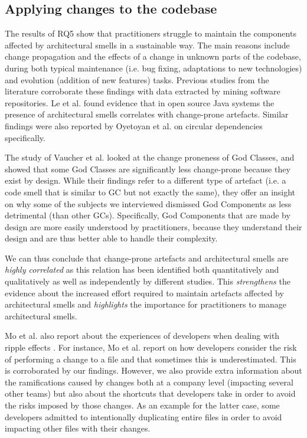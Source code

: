 \subsection{Applying changes to the codebase}
The results of RQ5 show that practitioners struggle to maintain the components affected by architectural smells in a sustainable way. The main reasons include change propagation and the effects of a change in unknown parts of the codebase, during both typical maintenance (i.e. bug fixing, adaptations to new technologies) and evolution (addition of new features) tasks.
Previous studies from the literature corroborate these findings with data extracted by mining software repositories. Le et al. \cite{Le2018} found evidence that in open source Java systems the presence of architectural smells correlates with change-prone artefacts. Similar findings were also reported by Oyetoyan et al. \cite{Oyetoyan2015} on circular dependencies specifically.

The study of Vaucher et al. \cite{Vaucher2009} looked at the change proneness of God Classes, and showed that some God Classes are significantly less change-prone because they exist by design. 
While their findings refer to a different type of artefact (i.e. a code smell that is similar to GC but not exactly the same), they offer an insight on why some of the subjects we interviewed dismissed God Components as less detrimental (than other GCs). Specifically, God Components that are made by design are more easily understood by practitioners, because they understand their design and are thus better able to handle their complexity. 

We can thus conclude that change-prone artefacts and architectural smells are \emph{highly correlated} as this relation has been identified both quantitatively and qualitatively as well as independently by different studies.
This \emph{strengthens} the evidence about the increased effort required to maintain artefacts affected by architectural smells and \emph{highlights} the importance for practitioners to manage architectural smells.

Mo et al. also report about the experiences of developers when dealing with ripple effects \cite{Mo2018}. For instance, Mo et al. report on how developers consider the risk of performing a change to a file and that sometimes this is underestimated. This is corroborated by our findings. However, we also provide extra information about the ramifications caused by changes both at a company level (impacting several other teams) but also about the shortcuts that developers take in order to avoid the risks imposed by those changes.
As an example for the latter case, some developers admitted to intentionally duplicating entire files in order to avoid impacting other files with their changes.

